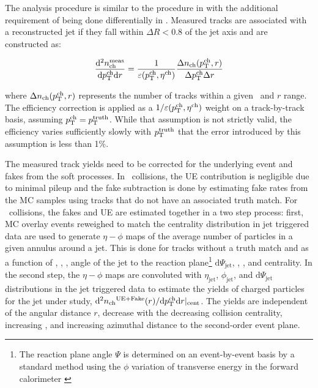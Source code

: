 
The analysis procedure is similar to the procedure in \cite{PhysRevC.98.024908} with the additional requirement of being done differentially in \rvar. Measured tracks are associated with a reconstructed jet if they fall within $\Delta R < 0.8$ of the jet axis and are constructed as:

\begin{eqnarray}
\dfrac{\mathrm{d}^{2} \mbox{$n_{\mathrm{ch}}^{\mathrm{meas}}$} }{ \mathrm{d} \mbox{$p_{\mathrm{T}}^{\mathrm{ch}}$} \mathrm{d} r} = \frac{1}{\varepsilon(\mbox{$p_{\mathrm{T}}^{\mathrm{ch}}$},\mbox{$\eta^{\mathrm{ch}}$})} \frac{\Delta \mbox{$n_{\mathrm{ch}}$}( \mbox{$p_{\mathrm{T}}^{\mathrm{ch}}$}, r)}{ \Delta\mbox{$p_{\mathrm{T}}^{\mathrm{ch}}$} \Delta r}
\end{eqnarray}

where $\Delta \mbox{$n_{\mathrm{ch}}$} (\mbox{$p_{\mathrm{T}}^{\mathrm{ch}}$}, r)$ represents the number of tracks within a given \pttrk\ and $r$ range. The efficiency correction is applied as a $1/\varepsilon(\mbox{$p_{\mathrm{T}}^{\mathrm{ch}}$},\mbox{$\eta^{\mathrm{ch}}$})$ weight on a track-by-track basis, assuming $\mbox{$p_{\mathrm{T}}^{\mathrm{ch}}$} = \mbox{$p_{\mathrm{T}}^{\mathrm{truth}}$}$. While that assumption is not strictly valid, the efficiency varies sufficiently slowly with $\mbox{$p_{\mathrm{T}}^{\mathrm{truth}}$}$ that the error
introduced by this assumption is less than 1\%.

The measured track yields need to be corrected for the underlying event and fakes from the soft processes. In \pp\ collisions, the UE contribution is negligible due to minimal pileup and the fake subtraction is done by estimating fake rates from the MC samples using tracks that do not have an associated truth match. For \pbpb\ collisions, the fakes and UE are estimated together in a two step process: first, MC overlay events reweighed to match the centrality distribution in jet triggered data are used to generate $\eta-\phi$ maps of the average number of particles in a given annulus around a jet. This is done for tracks without a truth match and as a function of \ptjet, \etajet, \phijet, angle of the jet to the reaction plane\footnote{The reaction plane angle $\Psi$ is determined on an event-by-event basis by a standard method using the $\phi$ variation of transverse energy in the forward calorimeter \cite{ATLAS:2012at}} $ \mathrm{d}\Psi_{\mathrm{jet}}$, \rvar, \pt, and centrality. In the second step, the $\eta-\phi$ maps are convoluted with $\eta_{\mathrm{jet}}$, $\phi_{\mathrm{jet}}$, and $\mathrm{d}\Psi_{\mathrm{jet}}$ distributions in the jet triggered data to estimate the yields of charged particles for the jet under study, \mbox{$\mathrm{d}^2 \mbox{$n_{\mathrm{ch}}$}^{\mathrm{UE+Fake}}(r) / \mathrm{d} \mbox{$p_{\mathrm{T}}^{\mathrm{ch}}$} \mathrm{d} r|_{\mathrm{cent}}$}. The yields are independent of the angular distance $r$, decrease with the decreasing collision centrality, increasing \pttrk, and increasing azimuthal distance to the second-order event plane. 

